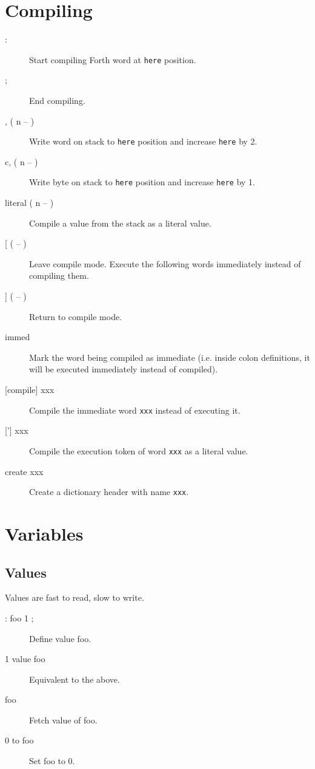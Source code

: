 \section{Compiling}

\begin{description}
\item[:] Start compiling Forth word at \texttt{here} position.
\item[;] End compiling.
\item[, ( n -- )] Write word on stack to \texttt{here} position and increase \texttt{here} by 2.
\item[c, ( n -- )] Write byte on stack to \texttt{here} position and increase \texttt{here} by 1.
\item[literal ( n -- )] Compile a value from the stack as a literal value.
\item[[ ( -- )] Leave compile mode. Execute the following words immediately instead of compiling them.
\item[{]} ( -- )] Return to compile mode.
\item[immed] Mark the word being compiled as immediate (i.e. inside colon definitions, it will be executed immediately instead of compiled).
\item[[compile{]} xxx] Compile the immediate word \texttt{xxx} instead of executing it.
\item[{[']} xxx] Compile the execution token of word \texttt{xxx} as a literal value.
\item[create xxx] Create a dictionary header with name \texttt{xxx}. 
\end{description}

\section{Variables}

\subsection{Values}

Values are fast to read, slow to write.

\begin{description}
\item[: foo 1 ;] Define value foo.
\item[1 value foo] Equivalent to the above.
\item[foo] Fetch value of foo.
\item[0 to foo] Set foo to 0.
\end{description}

